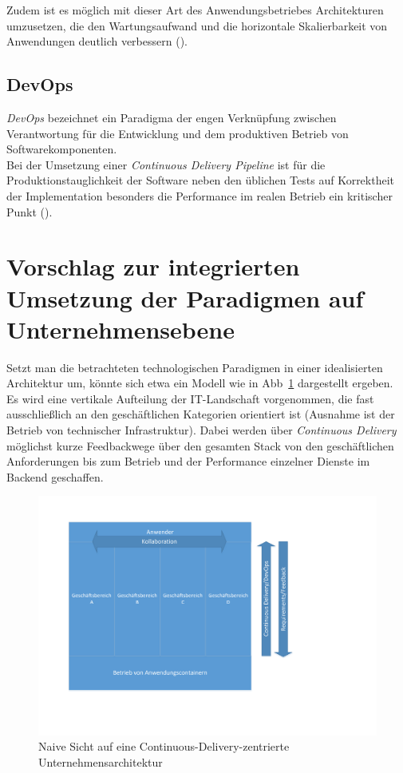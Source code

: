 \documentclass{llncs}
\begin{document}
Zudem ist es möglich mit dieser Art des Anwendungsbetriebes Architekturen umzusetzen, die den Wartungsaufwand und die horizontale Skalierbarkeit von Anwendungen deutlich verbessern (\cite{tof:bru}).

\subsection{DevOps}
\textit{DevOps} bezeichnet ein Paradigma der engen Verknüpfung zwischen Verantwortung für die Entwicklung und dem produktiven Betrieb von Softwarekomponenten.\\
Bei der Umsetzung einer \textit{Continuous Delivery Pipeline} ist für die Produktionstauglichkeit der Software neben den üblichen Tests auf Korrektheit der Implementation besonders die Performance im realen Betrieb ein kritischer Punkt (\cite{wal:ehm}).

\section{Vorschlag zur integrierten Umsetzung der Paradigmen auf Unternehmensebene}
Setzt man die betrachteten technologischen Paradigmen in einer idealisierten Architektur um, könnte sich etwa ein Modell wie in Abb~\ref{fig:model} dargestellt ergeben.\\

Es wird eine vertikale Aufteilung der IT-Landschaft vorgenommen, die fast ausschließlich an den geschäftlichen Kategorien orientiert ist (Ausnahme ist der Betrieb von technischer Infrastruktur). Dabei werden über \textit{Continuous Delivery} möglichst kurze Feedbackwege über den gesamten Stack von den geschäftlichen Anforderungen bis zum Betrieb und der Performance einzelner Dienste im Backend geschaffen.\\

\begin{figure}[ht!]
	\centering
  \includegraphics[scale=0.5]{simple_diagram.pdf}
	\caption{Naive Sicht auf eine Continuous-Delivery-zentrierte Unternehmensarchitektur}
	\label{fig:model}
\end{figure}
\end{document}
